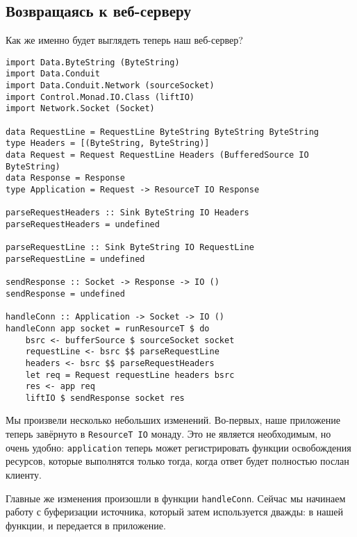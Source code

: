 \subsection{Возвращаясь к веб-серверу}
Как же именно будет выглядеть теперь наш веб-сервер?
\begin{lstlisting}
import Data.ByteString (ByteString)
import Data.Conduit
import Data.Conduit.Network (sourceSocket)
import Control.Monad.IO.Class (liftIO)
import Network.Socket (Socket)

data RequestLine = RequestLine ByteString ByteString ByteString
type Headers = [(ByteString, ByteString)]
data Request = Request RequestLine Headers (BufferedSource IO ByteString)
data Response = Response
type Application = Request -> ResourceT IO Response

parseRequestHeaders :: Sink ByteString IO Headers
parseRequestHeaders = undefined

parseRequestLine :: Sink ByteString IO RequestLine
parseRequestLine = undefined

sendResponse :: Socket -> Response -> IO ()
sendResponse = undefined

handleConn :: Application -> Socket -> IO ()
handleConn app socket = runResourceT $ do
    bsrc <- bufferSource $ sourceSocket socket
    requestLine <- bsrc $$ parseRequestLine
    headers <- bsrc $$ parseRequestHeaders
    let req = Request requestLine headers bsrc
    res <- app req
    liftIO $ sendResponse socket res
\end{lstlisting}

Мы произвели несколько небольших изменений. Во-первых, наше приложение теперь завёрнуто в
\lstinline=ResourceT IO= монаду. Это не является необходимым, но очень удобно:
\lstinline{application} теперь может регистрировать функции освобождения ресурсов,
которые выполнятся только тогда, когда ответ будет полностью послан клиенту.

Главные же изменения произошли в функции \lstinline=handleConn=. Сейчас мы начинаем работу
с буферизации источника, который затем используется дважды: в нашей функции, и передается в
приложение.


